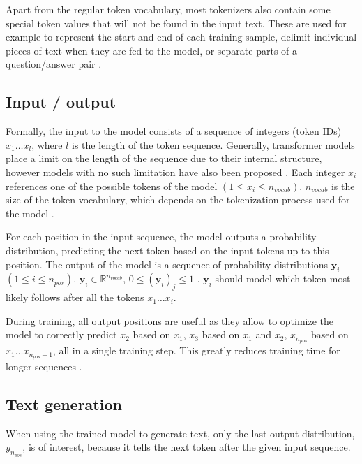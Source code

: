 Apart from the regular token vocabulary, most tokenizers also contain some special token values that will not be found in the input text. These are used for example to represent the start and end of each training sample, delimit individual pieces of text when they are fed to the model, or separate parts of a question/answer pair \cite{HuggingFaceTokenizers}.


\subsection{Input / output}

Formally, the input to the model consists of a sequence of integers (token IDs) $x_1 \ldots x_l$, where $l$ is the length of the token sequence.
Generally, transformer models place a limit on the length of the sequence due to their internal structure, however models with no such limitation have also been proposed \cite{su2023roformer}.
Each integer $x_i$ references one of the possible tokens of the model $(1 \leq x_i \leq n_{vocab})$. $n_{vocab}$ is the size of the token vocabulary, which depends on the tokenization process used for the model .

\label{transformer:output}

For each position in the input sequence, the model outputs a probability distribution, predicting the next token based on the input tokens up to this position. 
The output of the model is a sequence of probability distributions $\mathbf{y}_i$ $(1 \leq i \leq n_{pos})$. $\mathbf{y}_i \in \mathbb{R}^{n_{vocab}}$, $0 \leq (\mathbf{y}_i)_j \leq 1$  \cite{HuggingFaceGPT2}.
$\mathbf{y}_i$ should model which token most likely follows after all the tokens $x_1 \ldots x_i$.

During training, all output positions are useful as they allow to optimize the model to correctly predict $x_2$ based on $x_1$,
$x_3$ based on $x_1$ and $x_2$, $x_{n_{pos}}$ based on $x_1 \ldots x_{n_{pos}-1}$, all in a single training step. This greatly reduces training time for longer sequences \cite{alammar-gpt2}.

\subsection{Text generation}

When using the trained model to generate text, only the last output distribution, $y_{n_{pos}}$, is of interest, because
it tells the next token after the given input sequence. \cite{Mao2021Autoregressive}

